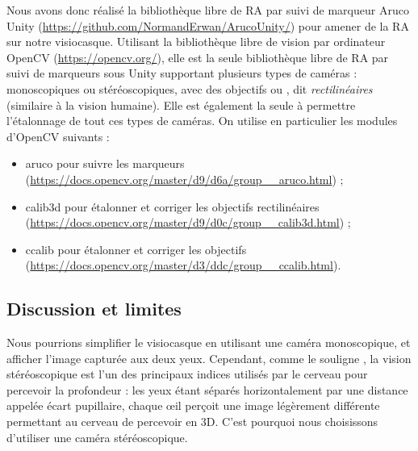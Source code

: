 Nous avons donc réalisé la bibliothèque libre de RA par suivi de marqueur Aruco Unity (\url{https://github.com/NormandErwan/ArucoUnity/}) pour amener de la RA sur notre visiocasque. Utilisant la bibliothèque libre de vision par ordinateur OpenCV (\url{https://opencv.org/}), elle est la seule bibliothèque libre de RA par suivi de marqueurs sous Unity supportant plusieurs types de caméras : monoscopiques ou stéréoscopiques, avec des objectifs  ou , dit \emph{rectilinéaires} (similaire à la vision humaine). Elle est également la seule à permettre l'étalonnage de tout ces types de caméras. On utilise en particulier les modules d'OpenCV suivants :
\begin{itemize}
  \item aruco pour suivre les marqueurs (\url{https://docs.opencv.org/master/d9/d6a/group__aruco.html}) ;
  \item calib3d pour étalonner et corriger les objectifs rectilinéaires (\url{https://docs.opencv.org/master/d9/d0c/group__calib3d.html}) ;
  \item ccalib pour étalonner et corriger les objectifs  (\url{https://docs.opencv.org/master/d3/ddc/group__ccalib.html}).
\end{itemize}


\subsection{Discussion et limites}
\label{subsec:solution_discusion}
Nous pourrions simplifier le visiocasque en utilisant une caméra monoscopique, et afficher l'image capturée aux deux yeux. Cependant, comme le souligne \cite{Bourke1999}, la vision stéréoscopique est l'un des principaux indices utilisés par le cerveau pour percevoir la profondeur : les yeux étant séparés horizontalement par une distance appelée écart pupillaire, chaque \oe il perçoit une image légèrement différente  permettant au cerveau de percevoir en 3D. C'est pourquoi nous choisissons d'utiliser une caméra stéréoscopique.


